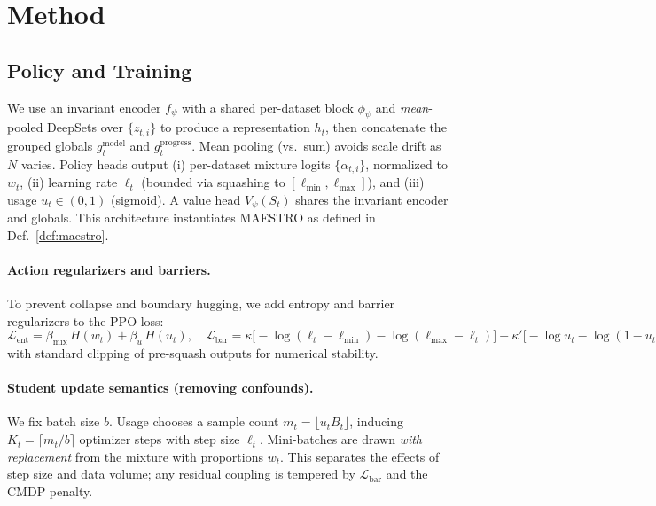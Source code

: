 \documentclass[11pt]{article}
\newcommand{\1}{\mathbf{1}}
\newcommand{\MAESTRO}{\textsc{MAESTRO}\xspace}
\begin{document}
\section{Method}
\subsection{Policy and Training}
We use an invariant encoder $f_\psi$ with a shared per-dataset block $\phi_\psi$ and \emph{mean}-pooled DeepSets over $\{z_{t,i}\}$ to produce a representation $h_t$, then concatenate the grouped globals $g^{\text{model}}_t$ and $g^{\text{progress}}_t$. Mean pooling (vs.\ sum) avoids scale drift as $N$ varies.
Policy heads output (i) per-dataset mixture logits $\{\alpha_{t,i}\}$, normalized to $w_t$, (ii) learning rate $\ell_t$ (bounded via squashing to $[\ell_{\min},\ell_{\max}]$), and (iii) usage $u_t\in(0,1)$ (sigmoid).
A value head $V_\psi(S_t)$ shares the invariant encoder and globals. This architecture instantiates \MAESTRO{} as defined in Def.~\ref{def:maestro}.

\paragraph{Action regularizers and barriers.}
To prevent collapse and boundary hugging, we add entropy and barrier regularizers to the PPO loss:
\(
\mathcal{L}_{\text{ent}}= \beta_{\text{mix}}\, H(w_t) + \beta_u\, H(u_t),\quad
\mathcal{L}_{\text{bar}}= \kappa\big[-\log(\ell_t-\ell_{\min})-\log(\ell_{\max}-\ell_t)\big] + \kappa'\big[-\log u_t - \log (1-u_t)\big],
\)
with standard clipping of pre-squash outputs for numerical stability.

\paragraph{Student update semantics (removing confounds).}
We fix batch size $b$.
Usage chooses a sample count $m_t=\lfloor u_t B_t\rfloor$, inducing $K_t=\lceil m_t/b\rceil$ optimizer steps with step size $\ell_t$.
Mini-batches are drawn \emph{with replacement} from the mixture with proportions $w_t$.
This separates the effects of step size and data volume; any residual coupling is tempered by $\mathcal{L}_{\text{bar}}$ and the CMDP penalty.
\end{document}
